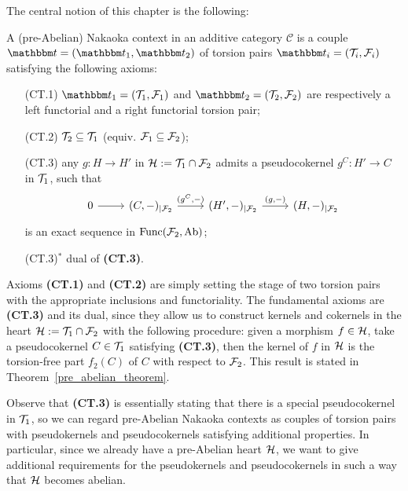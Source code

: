 The central notion of this chapter is the following:
\begin{nonlisting_def}
A (pre-Abelian) Nakaoka context in an additive category $\mathscr{C}$ is a couple $\t=(\t_1,\t_2)$ of torsion pairs $\t_i=(\T_i,\F_i)$ satisfying the following axioms:

\begin{enumerate}
  \item[(CT.1)] $\t_1=(\T_1,\F_1)$ and $\t_2=(\T_2,\F_2)$ are respectively a left functorial and a right functorial torsion pair;
  \item[(CT.2)] $\mathcal{T}_2\subseteq \mathcal{T}_1$ (equiv. $\mathcal{F}_1\subseteq\mathcal{F}_2$);
  \item[(CT.3)] any  $g\colon H\to H'$ in $\mathcal{H}:=\mathcal{T}_1\cap\mathcal{F}_2$ admits a pseudocokernel $g^C\colon H'\to C$ in $\mathcal{T}_1$, such that
    \begin{equation*}
      \begin{tikzcd}
        0\arrow{r} &(C,-)_{|\F_2}\arrow{r}{(g^C,-)} & (H',-)_{|\F_2}\arrow{r}{(g,-)}& (H,-)_{|\F_2}
      \end{tikzcd}
    \end{equation*}
    is an exact sequence in $\mathrm{Func}(\mathcal{F}_2,\mathrm{Ab})$;
  \item[(CT.3)$^\ast$] dual of \textbf{(CT.3)}.
\end{enumerate}
\end{nonlisting_def}

Axioms \textbf{(CT.1)} and \textbf{(CT.2)} are simply setting the stage of two torsion pairs with the appropriate inclusions and functoriality. The fundamental axioms are \textbf{(CT.3)} and its dual, since they allow us to construct kernels and cokernels in the heart $\mathcal{H}:=\mathcal{T}_1\cap\mathcal{F}_2$ with the following procedure: given a morphism $f\in\mathcal{H}$, take a pseudocokernel $C\in\mathcal{T}_1$ satisfying \textbf{(CT.3)}, then the kernel of $f$ in $\mathcal{H}$ is the torsion-free part $f_2(C)$ of $C$ with respect to $\mathcal{F}_2$. This result is stated in Theorem~\ref{pre_abelian_theorem}.

Observe that \textbf{(CT.3)} is essentially stating that there is a special pseudocokernel in $\mathcal{T}_1$, so we can regard pre-Abelian Nakaoka contexts as couples of torsion pairs with pseudokernels and pseudocokernels satisfying additional properties. In particular, since we already have a pre-Abelian heart $\mathcal{H}$, we want to give additional requirements for the pseudokernels and pseudocokernels in such a way that $\mathcal{H}$ becomes abelian.

